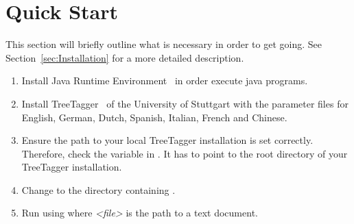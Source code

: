 \section{Quick Start}\label{sec:QuickStart}
This section will briefly outline what is necessary in order to get \product{} going. See Section~\ref{sec:Installation} for a more detailed description.
\begin{enumerate}
\item Install Java Runtime Environment~\cite{Java} in order execute java programs.
\item Install TreeTagger~\cite{TreeTagger} of the University of Stuttgart with the parameter files for English, German, Dutch, Spanish, Italian, French and Chinese.
\item Ensure the path to your local TreeTagger installation is set correctly. Therefore, check the variable  in \configFile{}. It has to point to the root directory of your TreeTagger installation.
\item Change to the directory containing \executableFile{}.
\item Run \product{} using \newline {} \newline where \emph{<file>} is the path to a text document.
\end{enumerate}
